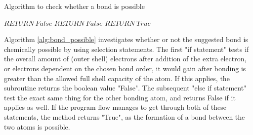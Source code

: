 \documentclass[a4paper,12pt]{article}
\begin{document}
\begin{center}
\end{center}

\begin{algorithm}
\footnotesize
\caption{Algorithm to check whether a bond is possible}\label{alg:bond_possible}
\begin{algorithmic}
	\State $ RETURN\ False$
	\State $ RETURN\ False$
\Else 
	\State $ RETURN\ True$
\EndIf
\EndFunction
\end{algorithmic}
\end{algorithm}

Algorithm \ref{alg:bond_possible} investigates whether or not the suggested bond is chemically possible by using selection statements. The first "if statement" tests if the overall amount of (outer shell) electrons after addition of the extra electron, or electrons dependent on the chosen bond order, it would gain after bonding is greater than the allowed full shell capacity of the atom. If this applies, the subroutine returns the boolean value "False". The subsequent "else if statement" test the exact same thing for the other bonding atom, and returns False if it applies as well. If the program flow manages to get through both of these statements, the method returns "True", as the formation of a bond between the two atoms is possible.
\end{document}
